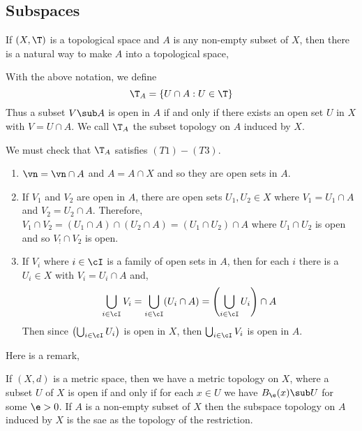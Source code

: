 
\subsection{Subspaces}
If $(X, \T)$ is a topological space and $A$ is any non-empty subset of $X$, then there is a natural way to make $A$ into a topological space,

\begin{ndefi}
  With the above notation, we define
  $$ \T_A = \{U \cap A : U \in \T\} $$
  Thus a subset $V \sub A$ is open in $A$ if and only if there exists an open set $U$ in $X$ with $V = U \cap A$. We call $\T_A$ the subset topology on $A$ induced by $X$.
\end{ndefi}

\noindent
We must check that $\T_A$ satisfies $(T1)-(T3)$.
\begin{enumerate}
  \item $\vn = \vn \cap A$ and $A = A \cap X$ and so they are open sets in $A$.
  \item If $V_1$ and $V_2$ are open in $A$, there are open sets $U_1, U_2 \in X$ where $V_1 = U_1 \cap A$ and $V_2 = U_2 \cap A$. Therefore, $V_1 \cap V_2 = (U_1 \cap A)\cap (U_2 \cap A) = (U_1 \cap U_2)\cap A$ where $U_1 \cap U_2$ is open and so $V_! \cap V_2$ is open.
  \item If $V_i$ where $i \in \cI$ is a family of open sets in $A$, then for each $i$ there is a $U_i \in X$ with $V_i = U_i \cap A$ and,
  $$ \bigcup_{i \in \cI} V_i = \bigcup_{i \in \cI}(U_i \cap A) = \left( \bigcup_{i \in \cI} U_i \right) \cap A $$
  Then since $\left( \bigcup_{i \in \cI} U_i \right)$ is open in $X$, then $\bigcup_{i \in \cI} V_i$ is open in $A$.
\end{enumerate}

\noindent
Here is a remark,
\begin{remark}
   If $(X, d)$ is a metric space, then we have a metric topology on $X$, where a subset $U$ of $X$ is open if and only if for each $x \in U$ we have $B_\e (x) \sub U$ for some $\e > 0$. If $A$ is a non-empty subset of $X$ then the subspace topology on $A$ induced by $X$ is the sae as the topology of the restriction.
\end{remark}

